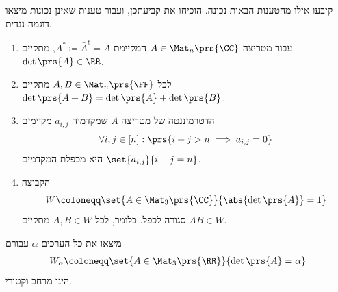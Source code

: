 \documentclass[a4paper,10pt,twoside,openany]{article}
\begin{document}
\begin{exercise}
קיבעו אילו מהטענות הבאות נכונה. הוכיחו את קביעתכן, ועבור טענות שאינן נכונות מיצאו דוגמה נגדית.

\begin{enumerate}
\item עבור מטריצה
$A \in \Mat_n\prs{\CC}$
המקיימת
$A^* \coloneqq \bar{A}^t = A$,
מתקיים
$\det\prs{A} \in \RR$.

\item לכל
$A,B \in \Mat_n\prs{\FF}$
מתקיים
$\det\prs{A+B} = \det\prs{A} + \det\prs{B}$.

\item
הדטרמיננטה של מטריצה
$A$
שמקדמיה
$a_{i,j}$
מקיימים
\[\forall i,j \in [n]: \prs{i+j > n \implies a_{i,j} = 0}\]
היא מכפלת המקדמים
$\set{a_{i,j}}{i+j = n}$.

\item
הקבוצה
\[W \coloneqq \set{A \in \Mat_3\prs{\CC}}{\abs{\det\prs{A}} = 1}\]
סגורה לכפל. כלומר, לכל
$A,B \in W$
מתקיים
$AB \in W$.
\end{enumerate}
\end{exercise}

\begin{exercise}
מיצאו את כל הערכים
$\alpha$
עבורם
\begin{align*}
W_\alpha \coloneqq \set{A \in \Mat_3\prs{\RR}}{\det\prs{A} = \alpha}
\end{align*}
הינו מרחב וקטורי.
\end{exercise}
\end{document}
